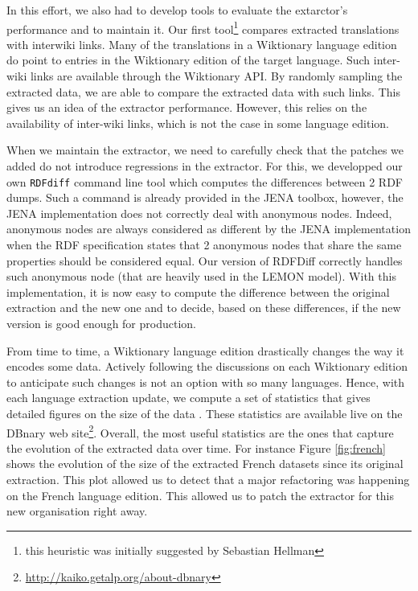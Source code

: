 \documentclass[10pt, a4paper]{article}
\begin{document}
In this effort, we also had to develop tools to evaluate the extarctor's performance and to maintain it. Our first tool\footnote{this heuristic was initially suggested by Sebastian Hellman} compares extracted translations with interwiki links. Many of the translations in a Wiktionary language edition do point to entries in the Wiktionary edition of the target language. Such inter-wiki links are available through the Wiktionary API. By randomly sampling the extracted data, we are able to compare the extracted data with such links. This gives us an idea of the extractor performance. However, this relies on the availability of inter-wiki links, which is not the case in some language edition.

When we maintain the extractor, we need to carefully check that the patches we added do not introduce regressions in the extractor. For this, we developped our own \texttt{RDFdiff} command line tool which computes the differences between 2 RDF dumps. Such a command is already provided in the JENA toolbox, however, the JENA implementation does not correctly deal with anonymous nodes. Indeed, anonymous nodes are always considered as different by the JENA implementation when the RDF specification states that 2 anonymous nodes that share the same properties should be considered equal. Our version of RDFDiff correctly handles such anonymous node (that are heavily used in the LEMON model). With this implementation, it is now easy to compute the difference between the original extraction and the new one and to decide, based on these differences, if the new version is good enough for production.

From time to time, a Wiktionary language edition drastically changes the way it encodes some data. Actively following the discussions on each Wiktionary edition to anticipate such changes is not an option with so many languages. Hence, with each language extraction update, we compute a set of statistics that gives detailed figures on the size of the data . These statistics are available live on the DBnary web site\footnote{\url{http://kaiko.getalp.org/about-dbnary}}. Overall, the most useful statistics are the ones that capture the evolution of the extracted data over time. For instance Figure \ref{fig:french} shows the evolution of the size of the extracted French datasets since its original extraction. This plot allowed us to detect that a major refactoring was happening on the French language edition. This allowed us to patch the extractor for this new organisation right away.
\end{document}
